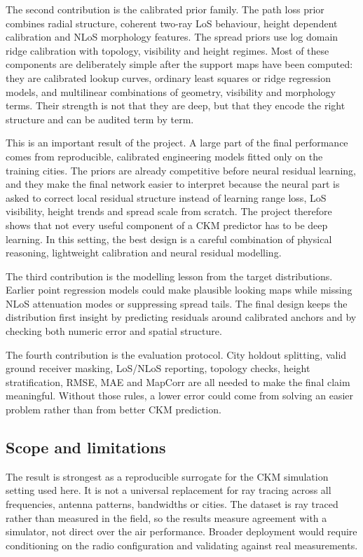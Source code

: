 The second contribution is the calibrated prior family. The path loss prior
combines radial structure, coherent two-ray LoS behaviour, height dependent
calibration and NLoS morphology features. The spread priors use log domain
ridge calibration with topology, visibility and height regimes. Most of these
components are deliberately simple after the support maps have been computed:
they are calibrated lookup curves, ordinary least squares or ridge regression
models, and multilinear combinations of geometry, visibility and morphology
terms. Their strength is not that they are deep, but that they encode the right
structure and can be audited term by term.

This is an important result of the project. A large part of the final
performance comes from reproducible, calibrated engineering models fitted only
on the training cities. The priors are already competitive before neural
residual learning, and they make the final network easier to interpret because
the neural part is asked to correct local residual structure instead of
learning range loss, LoS visibility, height trends and spread scale from
scratch. The project therefore shows that not every useful component of a CKM
predictor has to be deep learning. In this setting, the best design is a
careful combination of physical reasoning, lightweight calibration and neural
residual modelling.

The third contribution is the modelling lesson from the target distributions.
Earlier point regression models could make plausible looking maps while missing
NLoS attenuation modes or suppressing spread tails. The final design keeps the
distribution first insight by predicting residuals around calibrated anchors
and by checking both numeric error and spatial structure.

The fourth contribution is the evaluation protocol. City holdout splitting,
valid ground receiver masking, LoS/NLoS reporting, topology checks, height
stratification, RMSE, MAE and MapCorr are all needed to make the final claim
meaningful. Without those rules, a lower error could come from solving an
easier problem rather than from better CKM prediction.

\subsection{Scope and limitations}
\label{sec:limitations}

The result is strongest as a reproducible surrogate for the CKM simulation
setting used here. It is not a universal replacement for ray tracing across
all frequencies, antenna patterns, bandwidths or cities. The dataset is
ray traced rather than measured in the field, so the results measure agreement
with a simulator, not direct over the air performance. Broader deployment would
require conditioning on the radio configuration and validating against real
measurements.

